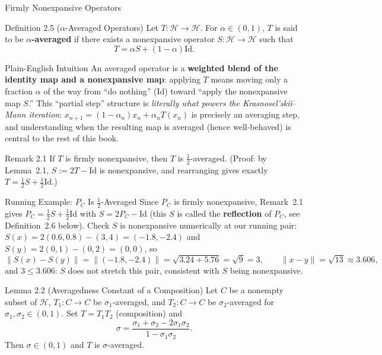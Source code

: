 \documentclass[aspectratio=169,10pt]{beamer}
\newcommand{\Id}{\mathrm{Id}}
\begin{document}
\begin{frame}[allowframebreaks]{Firmly Nonexpansive Operators}
  \framebreak

  \begin{block}{Definition 2.5 ($\alpha$-Averaged Operators)}
    Let $T : \mathcal{H} \to \mathcal{H}$. For $\alpha \in (0,1)$, $T$ is said
    to be \textbf{$\alpha$-averaged} if there exists a nonexpansive operator
    $S : \mathcal{H} \to \mathcal{H}$ such that
    \[
      T = \alpha S + (1-\alpha)\Id.
    \]
  \end{block}

  \begin{block}{Plain-English Intuition}
    An averaged operator is a \textbf{weighted blend of the identity map and a
    nonexpansive map}: applying $T$ means moving only a fraction $\alpha$ of
    the way from ``do nothing'' ($\Id$) toward ``apply the nonexpansive map
    $S$.'' This ``partial step'' structure is \emph{literally what powers the
    Krasnosel'ski\u{i}--Mann iteration}: $x_{n+1} = (1-\alpha_n)x_n +
    \alpha_n T(x_n)$ is precisely an averaging step, and understanding when
    the resulting map is averaged (hence well-behaved) is central to the rest
    of this book.
  \end{block}

  \begin{block}{Remark 2.1}
    If $T$ is firmly nonexpansive, then $T$ is $\tfrac{1}{2}$-averaged.
    (Proof: by Lemma~2.1, $S := 2T - \Id$ is nonexpansive, and rearranging
    gives exactly $T = \tfrac{1}{2}S + \tfrac{1}{2}\Id$.)
  \end{block}

  \framebreak

  \begin{exampleblock}{Running Example: $P_C$ Is $\tfrac{1}{2}$-Averaged}
    Since $P_C$ is firmly nonexpansive, Remark~2.1 gives $P_C =
    \tfrac{1}{2}S + \tfrac{1}{2}\Id$ with $S = 2P_C - \Id$ (this $S$ is called
    the \textbf{reflection} of $P_C$, see Definition~2.6 below). Check $S$ is
    nonexpansive numerically at our running pair: $S(x) = 2(0.6,0.8)-(3,4) =
    (-1.8,-2.4)$ and $S(y) = 2(0,1)-(0,2) = (0,0)$, so
    \[
      \|S(x)-S(y)\| = \|(-1.8,-2.4)\| = \sqrt{3.24+5.76}=\sqrt{9}=3,
      \qquad \|x-y\| = \sqrt{13}\approx 3.606,
    \]
    and $3 \le 3.606$: $S$ does not stretch this pair, consistent with $S$
    being nonexpansive.
  \end{exampleblock}

  \begin{block}{Lemma 2.2 (Averagedness Constant of a Composition)}
    Let $C$ be a nonempty subset of $\mathcal{H}$, $T_1 : C \to C$ be
    $\sigma_1$-averaged, and $T_2 : C \to C$ be $\sigma_2$-averaged for
    $\sigma_1, \sigma_2 \in (0,1)$. Set $T = T_1 T_2$ (composition) and
    \[
      \sigma = \frac{\sigma_1 + \sigma_2 - 2\sigma_1\sigma_2}{1 - \sigma_1\sigma_2}.
      \tag{2.1}
    \]
    Then $\sigma \in (0,1)$ and $T$ is $\sigma$-averaged.
  \end{block}


\end{frame}
\end{document}
